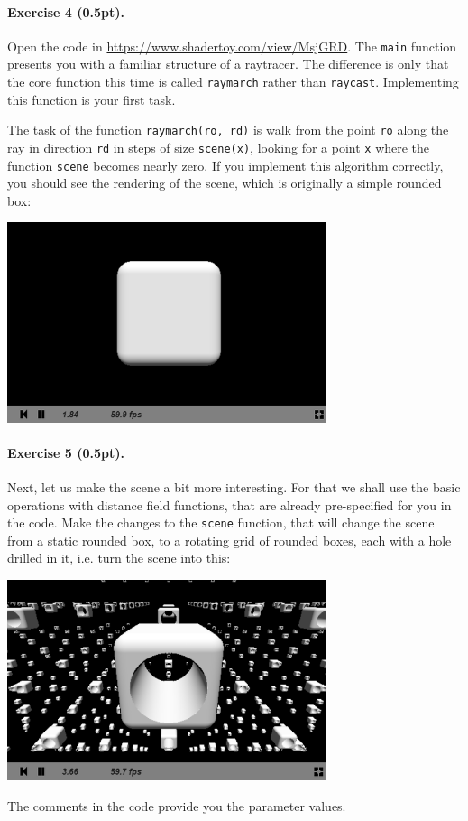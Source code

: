 \documentclass{article}
\newenvironment{exercise}[2]{\paragraph{Exercise #1 (#2pt).} }{
\medskip}
\begin{document}
\begin{exercise}{4}{0.5}
Open the code in \url{https://www.shadertoy.com/view/MsjGRD}. The \texttt{main} function presents you with a familiar structure of a raytracer. The difference is only that the core function this time is called \texttt{raymarch} rather than \texttt{raycast}. Implementing this function is your first task. 

The task of the function \texttt{raymarch(ro, rd)} is walk from the point \texttt{ro} along the ray in direction \texttt{rd} in steps of size \texttt{scene(x)}, looking for a point \texttt{x} where the function \texttt{scene} becomes nearly zero. If you implement this algorithm correctly, you should see the rendering of the scene, which is originally a simple rounded box:
\begin{center}
\includegraphics[width=0.7\textwidth]{raymarching1.png}
\end{center}
\end{exercise}


\begin{exercise}{5}{0.5}
Next, let us make the scene a bit more interesting. For that we shall use the basic operations with distance field functions, that are already pre-specified for you in the code. Make the changes to the \texttt{scene} function, that will change the scene from a static rounded box, to a rotating grid of rounded boxes, each with a hole drilled in it, i.e. turn the scene into this:
\begin{center}
\includegraphics[width=0.7\textwidth]{raymarching2.png}
\end{center}
The comments in the code provide you the parameter values.
\end{exercise}
\end{document}
